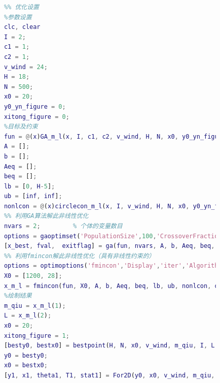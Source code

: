 \documentclass[UTF8]{ctexbook}
\theoremstyle{nonumberplain}
\begin{document}
            \begin{lstlisting}[language = Matlab]
            %% 此文件用于求解第三问，最优m_qiu、L和I使单一目标最小
            %% 优化设置
            %参数设置
            clc, clear
            I = 2;
            c1 = 1;
            c2 = 1;
            v_wind = 24;
            H = 18;
            N = 500;
            x0 = 20;
            y0_yn_figure = 0;
            xitong_figure = 0;
            %目标及约束
            fun = @(x)GA_m_l(x, I, c1, c2, v_wind, H, N, x0, y0_yn_figure, xitong_figure);
            A = [];
            b = [];
            Aeq = [];
            beq = [];
            lb = [0, H-5];
            ub = [inf, inf];
            nonlcon = @(x)circlecon_m_l(x, I, v_wind, H, N, x0, y0_yn_figure, xitong_figure);
            %% 利用GA算法解此非线性优化
            nvars = 2;         % 个体的变量数目
            options = gaoptimset('PopulationSize',100,'CrossoverFraction',0.75,'Generations',20,'StallGenLimit',40,'PlotFcns',{@gaplotbestf,@gaplotbestindiv}); %参数设置
            [x_best, fval,  exitflag] = ga(fun, nvars, A, b, Aeq, beq, lb, ub, nonlcon, options);
            %% 利用fmincon解此非线性优化（具有非线性约束的）
            options = optimoptions('fmincon','Display','iter','Algorithm','sqp');
            X0 = [1200, 28];
            x_m_l = fmincon(fun, X0, A, b, Aeq, beq, lb, ub, nonlcon, options);
            %绘制结果
            m_qiu = x_m_l(1);
            L = x_m_l(2);
            x0 = 20;
            xitong_figure = 1;
            [besty0, bestx0] = bestpoint(H, N, x0, v_wind, m_qiu, I, L, y0_yn_figure);
            y0 = besty0;
            x0 = bestx0;
            [y1, x1, theta1, T1, stat1] = For2D(y0, x0, v_wind, m_qiu, I, L, xitong_figure);
            \end{lstlisting}
\end{document}
